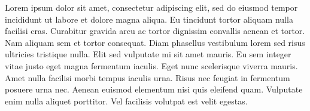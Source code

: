 Lorem ipsum dolor sit amet, consectetur adipiscing elit, sed do eiusmod tempor incididunt ut labore et dolore magna aliqua.
Eu tincidunt tortor aliquam nulla facilisi cras.
Curabitur gravida arcu ac tortor dignissim convallis aenean et tortor.
Nam aliquam sem et tortor consequat.
Diam phasellus vestibulum lorem sed risus ultricies tristique nulla.
Elit sed vulputate mi sit amet mauris.
Eu sem integer vitae justo eget magna fermentum iaculis.
Eget nunc scelerisque viverra mauris.
Amet nulla facilisi morbi tempus iaculis urna.
Risus nec feugiat in fermentum posuere urna nec.
Aenean euismod elementum nisi quis eleifend quam.
Vulputate enim nulla aliquet porttitor.
Vel facilisis volutpat est velit egestas.

